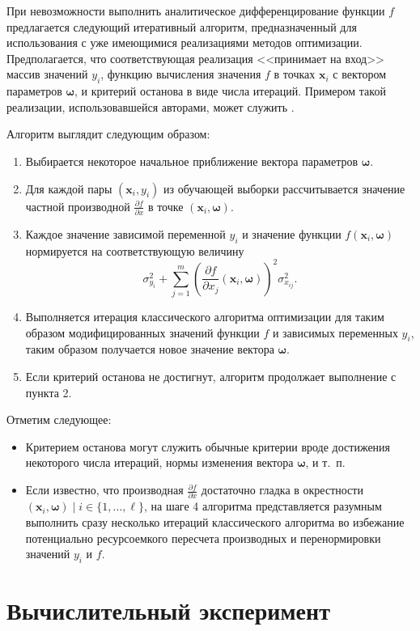 \documentclass[tikz,11pt,a4paper]{article}
\newcommand{\bomega}{\boldsymbol{\omega}}
\begin{document}
При невозможности выполнить аналитическое дифференцирование функции $f$ предлагается
следующий итеративный алгоритм, предназначенный для использования с уже имеющимися
реализациями методов оптимизации. Предполагается, что соответствующая реализация
<<принимает на вход>> массив значений $y_i$,
функцию вычисления значения $f$ в точках $\mathbf{x}_i$ с вектором параметров $\bomega$,
и критерий останова в виде числа итераций. Примером такой реализации, использовавшейся
авторами, может служить \cite{dlib09}.

Алгоритм выглядит следующим образом:
\begin{enumerate}
  \item Выбирается некоторое начальное приближение вектора параметров $\bomega$.
  \item Для каждой пары $(\mathbf{x}_i, y_i)$ из обучающей выборки рассчитывается значение
	частной производной $\frac{\partial f}{\partial x}$ в точке $(\mathbf{x}_i, \bomega)$.
  \item Каждое значение зависимой переменной $y_i$ и значение функции $f(\mathbf{x}_i, \bomega)$
	нормируется на соответствующую величину
	\[
	  \sigma_{y_i}^2 + \sum_{j = 1}^m (\frac{\partial f}{\partial x_j}(\mathbf{x}_i, \bomega))^2 \sigma^2_{x_{ij}}.
	\]
  \item Выполняется итерация классического алгоритма оптимизации для таким образом
	модифицированных значений функции $f$ и зависимых переменных $y_i$, таким образом
	получается новое значение вектора $\bomega$.
  \item Если критерий останова не достигнут, алгоритм продолжает выполнение с пункта 2.
\end{enumerate}

Отметим следующее:
\begin{itemize}
  \item Критерием останова могут служить обычные критерии вроде достижения некоторого
    числа итераций, нормы изменения вектора $\bomega$, и т.~п.
  \item Если известно, что производная $\frac{\partial f}{\partial x}$ достаточно гладка
	в окрестности $(\mathbf{x}_i, \bomega) \mid i \in \{ 1, \dots, \ell \}$, на шаге
	4 алгоритма представляется разумным выполнить сразу несколько итераций
	классического алгоритма во избежание потенциально ресурсоемкого пересчета производных и
	перенормировки значений $y_i$ и $f$.
\end{itemize}

\section{Вычислительный эксперимент}
\end{document}
